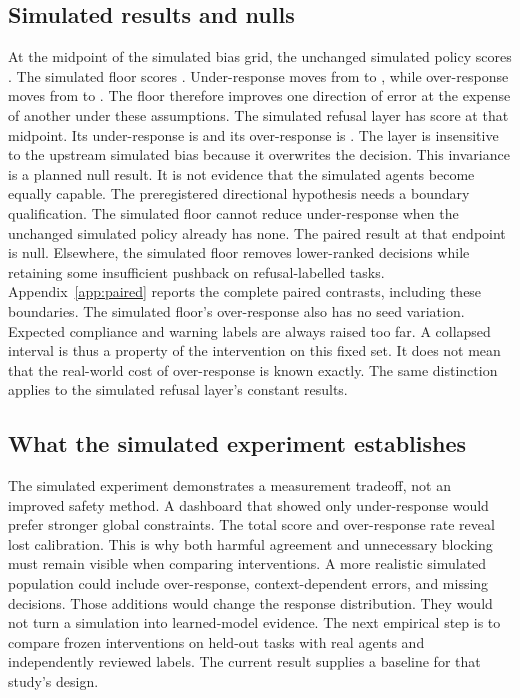 \documentclass{article}
\begin{document}
\subsection{Simulated results and nulls}

\begin{table}[t]\centering\scriptsize\caption{Complete simulated grid. Each cell uses \seedCount{} seeds over the fixed tasks. Brackets show 95\% seed-bootstrap intervals, not uncertainty about a learned-agent population.}\label{tab:sim}\end{table}
At the midpoint of the simulated bias grid, the unchanged simulated policy scores \simnonescore{}. The simulated floor scores \simfloorscore{}. Under-response moves from \simnoneunder{} to \simfloorunder{}, while over-response moves from \simnoneover{} to \simfloorover{}. The floor therefore improves one direction of error at the expense of another under these assumptions.
The simulated refusal layer has score \simrefusescore{} at that midpoint. Its under-response is \simrefuseunder{} and its over-response is \simrefuseover{}. The layer is insensitive to the upstream simulated bias because it overwrites the decision. This invariance is a planned null result. It is not evidence that the simulated agents become equally capable.
The preregistered directional hypothesis needs a boundary qualification. The simulated floor cannot reduce under-response when the unchanged simulated policy already has none. The paired result at that endpoint is null. Elsewhere, the simulated floor removes lower-ranked decisions while retaining some insufficient pushback on refusal-labelled tasks. Appendix~\ref{app:paired} reports the complete paired contrasts, including these boundaries.
The simulated floor's over-response also has no seed variation. Expected compliance and warning labels are always raised too far. A collapsed interval is thus a property of the intervention on this fixed set. It does not mean that the real-world cost of over-response is known exactly. The same distinction applies to the simulated refusal layer's constant results.
\subsection{What the simulated experiment establishes}
The simulated experiment demonstrates a measurement tradeoff, not an improved safety method. A dashboard that showed only under-response would prefer stronger global constraints. The total score and over-response rate reveal lost calibration. This is why both harmful agreement and unnecessary blocking must remain visible when comparing interventions.
A more realistic simulated population could include over-response, context-dependent errors, and missing decisions. Those additions would change the response distribution. They would not turn a simulation into learned-model evidence. The next empirical step is to compare frozen interventions on held-out tasks with real agents and independently reviewed labels. The current result supplies a baseline for that study's design.
\end{document}
